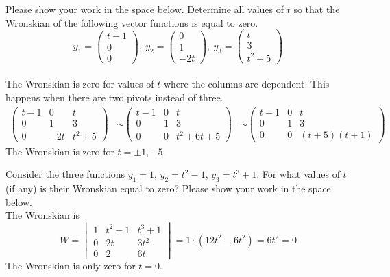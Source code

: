 \ifnum {}
\question[3] Please show your work in the space below. Determine all values of $t$ so that the Wronskian of the following vector functions is equal to zero.  
$$y_1 = \begin{pmatrix} t-1\\0\\0\end{pmatrix}, \ y_2 = \begin{pmatrix} 0\\1\\-2t\end{pmatrix}, \ y_3 = \begin{pmatrix} t\\3\\t^2+5 \end{pmatrix}$$
\ifnum {} {\color{DarkBlue} \\[12pt] The Wronskian is zero for values of $t$ where the columns are dependent. This happens when there are two pivots instead of three. 
\begin{align}
    \begin{pmatrix} t-1&0&t\\0&1&3\\0&-2t&t^2+5\end{pmatrix} 
    &\sim \begin{pmatrix} t-1&0&t\\0&1&3\\0&0&t^2+6t+5\end{pmatrix} 
    &\sim \begin{pmatrix} t-1&0&t\\0&1&3\\0&0&(t+5)(t+1)\end{pmatrix} 
\end{align} The Wronskian is zero for $t =\pm1,-5$. 
} 
\else 
\vfill
\fi
\fi


\ifnum {}
\question[3] Consider the three functions $y_1 = 1$, $y_2 = t^2-1$, $y_3 = t^3+1$. For what values of $t$ (if any) is their Wronskian equal to zero? Please show your work in the space below. 
\ifnum {} {\color{DarkBlue} \\[12pt] The Wronskian is $$W = \begin{vmatrix} 1&t^2-1&t^3+1\\0&2t&3t^2\\0&2&6t \end{vmatrix} = 1\cdot (12t^2 - 6t^2) =6t^2=0$$ The Wronskian is only zero for $t=0$. 
} 
\else 
\vfill
\fi
\fi